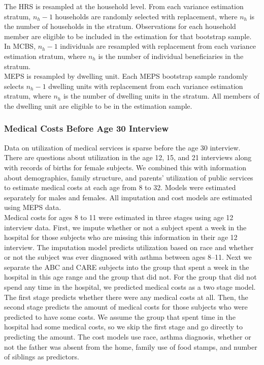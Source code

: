 \noindent The HRS is resampled at the household level. From each variance estimation stratum, $n_h-1$ households are randomly selected with replacement, where $n_h$ is the number of households in the stratum. Observations for each household member are eligible to be included in the estimation for that bootstrap sample. \\

\noindent In MCBS, $n_h-1$ individuals are resampled with replacement from each variance estimation stratum, where $n_h$ is the number of individual beneficiaries in the stratum. \\

\noindent MEPS is resampled by dwelling unit.  Each MEPS bootstrap sample randomly selects $n_h-1$ dwelling units with replacement from each variance estimation stratum, where $n_h$ is the number of dwelling units in the stratum.  All members of the dwelling unit are eligible to be in the estimation sample.

\subsubsection{Medical Costs Before Age 30 Interview}

\noindent Data on utilization of medical services is sparse before the age 30 interview.  There are questions about utilization in the age 12, 15, and 21 interviews along with records of births for female subjects.  We combined this with information about demographics, family structure, and parents' utilization of public services to estimate medical costs at each age from 8 to 32.  Models were estimated separately for males and females.  All imputation and cost models are estimated using MEPS data. \\

\noindent Medical costs for ages 8 to 11 were estimated in three stages using age 12 interview data. First, we impute whether or not a subject spent a week in the hospital for those subjects who are missing this information in their age 12 interview.  The imputation model predicts utilization based on race and whether or not the subject was ever diagnosed with asthma between ages 8--11.  Next we separate the ABC and CARE subjects into the group that spent a week in the hospital in this age range and the group that did not.  For the group that did not spend any time in the hospital, we predicted medical costs as a two stage model.  The first stage predicts whether there were any medical costs at all.  Then, the second stage predicts the amount of medical costs for those subjects who were predicted to have some costs.  We assume the group that spent time in the hospital had some medical costs, so we skip the first stage and go directly to predicting the amount.  The cost models use race, asthma diagnosis, whether or not the father was absent from the home, family use of food stamps, and number of siblings as predictors.\\

